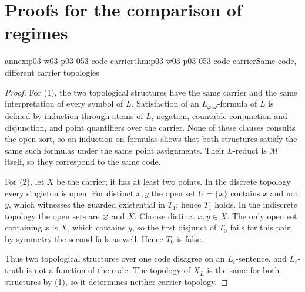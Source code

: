 \section{Proofs for the comparison of regimes}
\label{sec:p03-w03-p03-053-annex}

\begin{annexitem}{annex:p03-w03-p03-053-code-carrier}{thm:p03-w03-p03-053-code-carrier}{Same code, different carrier topologies}
\begin{proof}
For (1), the two topological structures have the same carrier and the
same interpretation of every symbol of \(L\). Satisfaction of an
\(L_{\omega_1\omega}\)-formula of \(L\) is defined by induction through
atoms of \(L\), negation, countable conjunction and disjunction, and
point quantifiers over the carrier. None of these clauses consults the
open sort, so an induction on formulas shows that both structures satisfy
the same such formulas under the same point assignments. Their
\(L\)-reduct is \(\mathcal M\) itself, so they correspond to the same
code.

For (2), let \(X\) be the carrier; it has at least two points. In the
discrete topology every singleton is open. For distinct \(x,y\) the open
set \(U=\{x\}\) contains \(x\) and not \(y\), which witnesses the
guarded existential in \(T_1\); hence \(T_1\) holds. In the indiscrete
topology the open sets are \(\varnothing\) and \(X\). Choose distinct
\(x,y\in X\). The only open set containing \(x\) is \(X\), which contains
\(y\), so the first disjunct of \(T_0\) fails for this pair; by symmetry
the second fails as well. Hence \(T_0\) is false.

Thus two topological structures over one code disagree on an
\(L_t\)-sentence, and \(L_t\)-truth is not a function of the code. The
topology of \(X_L\) is the same for both structures by (1), so it
determines neither carrier topology.
\end{proof}
\end{annexitem}

